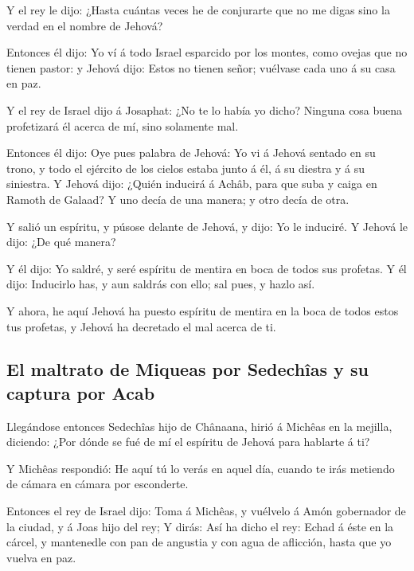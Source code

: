  Y el rey le dijo: ¿Hasta cuántas veces he de conjurarte
que no me digas sino la verdad en el nombre de Jehová?

 Entonces él dijo: Yo ví á todo Israel esparcido por los
montes, como ovejas que no tienen pastor: y Jehová dijo: Estos no tienen
señor; vuélvase cada uno á su casa en paz.

 Y el rey de Israel dijo á Josaphat: ¿No te lo había yo
dicho? Ninguna cosa buena profetizará él acerca de mí, sino solamente
mal.

 Entonces él dijo: Oye pues palabra de Jehová: Yo vi á
Jehová sentado en su trono, y todo el ejército de los cielos estaba
junto á él, á su diestra y á su siniestra.  Y Jehová dijo:
¿Quién inducirá á Achâb, para que suba y caiga en Ramoth de Galaad? Y
uno decía de una manera; y otro decía de otra.

 Y salió un espíritu, y púsose delante de Jehová, y dijo:
Yo le induciré. Y Jehová le dijo: ¿De qué manera?

 Y él dijo: Yo saldré, y seré espíritu de mentira en boca
de todos sus profetas. Y él dijo: Inducirlo has, y aun saldrás con ello;
sal pues, y hazlo así.

 Y ahora, he aquí Jehová ha puesto espíritu de mentira en
la boca de todos estos tus profetas, y Jehová ha decretado el mal acerca
de ti.

\hypertarget{el-maltrato-de-miqueas-por-sedechuxeeas-y-su-captura-por-acab}{%
\subsection{El maltrato de Miqueas por Sedechîas y su captura por
Acab}\label{el-maltrato-de-miqueas-por-sedechuxeeas-y-su-captura-por-acab}}

 Llegándose entonces Sedechîas hijo de Chânaana, hirió á
Michêas en la mejilla, diciendo: ¿Por dónde se fué de mí el espíritu de
Jehová para hablarte á ti?

 Y Michêas respondió: He aquí tú lo verás en aquel día,
cuando te irás metiendo de cámara en cámara por esconderte.

 Entonces el rey de Israel dijo: Toma á Michêas, y vuélvelo
á Amón gobernador de la ciudad, y á Joas hijo del rey;  Y
dirás: Así ha dicho el rey: Echad á éste en la cárcel, y mantenedle con
pan de angustia y con agua de aflicción, hasta que yo vuelva en paz.

